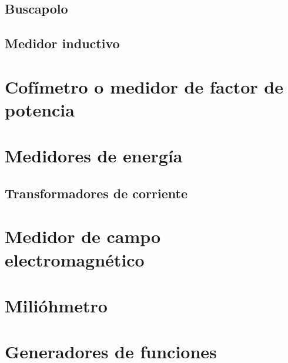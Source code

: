 \subsection{Buscapolo}
\subsection{Medidor inductivo}
\section{Cofímetro o medidor de factor de potencia}
\section{Medidores de energía}
\subsection{Transformadores de corriente}
\section{Medidor de campo electromagnético}
\section{Milióhmetro}
\section{Generadores de funciones}